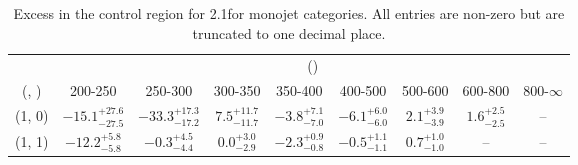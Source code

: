 \begin{table}[h!]
\tiny
\centering
\caption{Excess in the \mmj control region for 2.1\ifb for monojet categories. All entries are non-zero but are truncated to one decimal place.\label{tab:excesssepnaive_mumu_ewk_mono}}
\begin{tabular}
{ccccccccc}
	\hline\hline
	& \multicolumn{8}{c}{\scalht (\gev)} \\ 
	 (\njet,  \nb) & 200-250 & 250-300 & 300-350 & 350-400 & 400-500 & 500-600 & 600-800 & 800-$\infty$ \\ [0.8ex] 
\hline
	(1, 0) & $-15.1^{+ 27.6 }_{- 27.5 }$ & $-33.3^{+ 17.3 }_{- 17.2 }$ & $7.5^{+ 11.7 }_{- 11.7 }$ & $-3.8^{+ 7.1 }_{- 7.0 }$ & $-6.1^{+ 6.0 }_{- 6.0 }$ & $2.1^{+ 3.9 }_{- 3.9 }$ & $1.6^{+ 2.5 }_{- 2.5 }$ & -- \\[0.5ex] 
	(1, 1) & $-12.2^{+ 5.8 }_{- 5.8 }$ & $-0.3^{+ 4.5 }_{- 4.4 }$ & $0.0^{+ 3.0 }_{- 2.9 }$ & $-2.3^{+ 0.9 }_{- 0.8 }$ & $-0.5^{+ 1.1 }_{- 1.1 }$ & $0.7^{+ 1.0 }_{- 1.0 }$ & -- & -- \\[0.5ex] 
	\hline
	\hline
\end{tabular}
\end{table}
